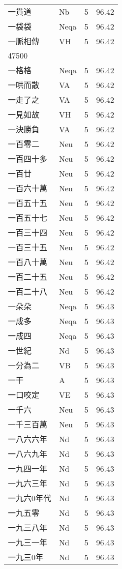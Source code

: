 \documentclass[twocolumn]{book}
\begin{document}
\begin{supertabular}{llrr}
一貫道 & Nb & 5 &  96.42\\
一袋袋 & Neqa & 5 &  96.42\\
一脈相傳 & VH & 5 &  96.42\\
47500\\
一格格 & Neqa & 5 &  96.42\\
一哄而散 & VA & 5 &  96.42\\
一走了之 & VA & 5 &  96.42\\
一見如故 & VH & 5 &  96.42\\
一決勝負 & VA & 5 &  96.42\\
一百零二 & Neu & 5 &  96.42\\
一百四十多 & Neu & 5 &  96.42\\
一百廿 & Neu & 5 &  96.42\\
一百六十萬 & Neu & 5 &  96.42\\
一百五十五 & Neu & 5 &  96.42\\
一百五十七 & Neu & 5 &  96.42\\
一百三十四 & Neu & 5 &  96.42\\
一百三十五 & Neu & 5 &  96.42\\
一百八十萬 & Neu & 5 &  96.42\\
一百二十五 & Neu & 5 &  96.42\\
一百二十八 & Neu & 5 &  96.42\\
一朵朵 & Neqa & 5 &  96.43\\
一成多 & Neqa & 5 &  96.43\\
一成四 & Neqa & 5 &  96.43\\
一世紀 & Nd & 5 &  96.43\\
一分為二 & VB & 5 &  96.43\\
一干 & A & 5 &  96.43\\
一口咬定 & VE & 5 &  96.43\\
一千六 & Neu & 5 &  96.43\\
一千三百萬 & Neu & 5 &  96.43\\
一八六六年 & Nd & 5 &  96.43\\
一八六九年 & Nd & 5 &  96.43\\
一九四一年 & Nd & 5 &  96.43\\
一九六三年 & Nd & 5 &  96.43\\
一九六0年代 & Nd & 5 &  96.43\\
一九五零 & Nd & 5 &  96.43\\
一九三八年 & Nd & 5 &  96.43\\
一九三一年 & Nd & 5 &  96.43\\
一九三0年 & Nd & 5 &  96.43\\

\end{supertabular}
\end{document}
